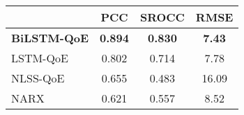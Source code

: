 \begin{tabular}{|l|c|c|c|}
  \hline
  & PCC & SROCC & RMSE\\
  \hline
  
  \textbf{BiLSTM-QoE} & \textbf{0.894} & \textbf{0.830} & \textbf{7.43}\\ \hline
  LSTM-QoE \citep{QoEModel_LSTM} & 0.802 & 0.714 & 7.78\\ \hline
  NLSS-QoE \citep{QoEModel_NLSS} & 0.655 & 0.483 & 16.09\\ \hline
  NARX \citep{QoEModel_NARX_DynamicNetworks} & 0.621 & 0.557 & 8.52\\ \hline
  
\end{tabular}